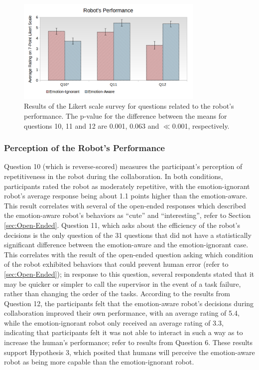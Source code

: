 \documentclass[12pt]{report}
\begin{document}
\begin{figure}[tbh]
\centering
\includegraphics[width=0.8\textwidth]{figure/Overall-Performance.png}
\caption{\fontsize{10}{10}\selectfont Results of the Likert scale survey for
questions related to the robot's performance. The p-value for the difference
between the means for questions 10, 11 and 12 are 0.001, 0.063 and $\ll$0.001,
respectively.}
\label{fig:overall-performance}
\end{figure}

\subsubsection{Perception of the Robot's Performance} 
\label{sec:Performance}
Question 10 (which is reverse-scored) measures the participant's perception of
repetitiveness in the robot during the collaboration. In both conditions,
participants rated the robot as moderately repetitive, with the emotion-ignorant
robot's average response being about 1.1 points higher than the emotion-aware.
This result correlates with several of the open-ended responses which described
the emotion-aware robot's behaviors as ``cute'' and ``interesting'', refer to
Section \ref{sec:Open-Ended}. Question 11, which asks about the efficiency of
the robot's decisions is the only question of the 31 questions that did not have
a statistically significant difference between the emotion-aware and the
emotion-ignorant case. This correlates with the result of the open-ended
question asking which condition of the robot exhibited behaviors that could
prevent human error (refer to \ref{sec:Open-Ended}); in response to this
question, several respondents stated that it may be quicker or simpler to call
the supervisor in the event of a task failure, rather than changing the order of
the tasks. According to the results from Question 12, the participants felt that
the emotion-aware robot's decisions during collaboration improved their own
performance, with an average rating of 5.4, while the emotion-ignorant robot
only received an average rating of 3.3, indicating that participants felt it was
not able to interact in such a way as to increase the human's performance; refer
to results from Question 6. These results support Hypothesis 3, which posited
that humans will perceive the emotion-aware robot as being more capable than the
emotion-ignorant robot.
\end{document}
